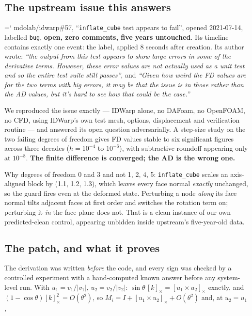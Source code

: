 \documentclass[11pt,a4paper]{article}
\newcommand{\artifact}[1]{{\small\ttfamily\hyphenchar\font=`\-\relax
  \def\_{\textunderscore\allowbreak}#1}}
\begin{document}
\subsection{The upstream issue this answers}

\artifact{mdolab/idwarp\#57}, ``\texttt{inflate\_cube} test appears to fail'', opened
2021-07-14, labelled \texttt{bug}, \textbf{open, zero comments, five years untouched}. Its
timeline contains exactly one event: the label, applied 8 seconds after creation. Its author
wrote: \emph{``the output from this test appears to show large errors in some of the
derivative terms. However, these error values are not actually used as a unit test and so the
entire test suite still passes''}, and \emph{``Given how weird the FD values are for the two
terms with big errors, it may be that the issue is in those rather than the AD values, but
it's hard to see how that could be the case.''}

We reproduced the issue exactly --- IDWarp alone, no DAFoam, no OpenFOAM, no CFD, using
IDWarp's own test mesh, options, displacement and verification routine --- and answered its
open question adversarially. A step-size study on the two failing degrees of freedom gives FD
values stable to six significant figures across three decades (\(h = 10^{-4}\) to
\(10^{-6}\)), with subtractive roundoff appearing only at \(10^{-8}\).
\textbf{The finite difference is converged; the AD is the wrong one.}

Why degrees of freedom 0 and 3 and not 1, 2, 4, 5: \texttt{inflate\_cube} scales an
axis-aligned block by (1.1, 1.2, 1.3), which leaves every face normal \emph{exactly}
unchanged, so the guard fires even at the deformed state. Perturbing a node \emph{along} its
face normal tilts adjacent faces at first order and switches the rotation term on; perturbing
it \emph{in} the face plane does not. That is a clean instance of our own predicted-clean
control, appearing unbidden inside upstream's five-year-old data.

\subsection{The patch, and what it proves}

The derivation was written \emph{before} the code, and every sign was checked by a controlled
experiment with a hand-computed known answer before any system-level run. With
\(u_1 = v_1/\lvert v_1\rvert\), \(u_2 = v_2/\lvert v_2\rvert\): \(\sin\theta\,[k]_\times =
[u_1\times u_2]_\times\) exactly, and \((1-\cos\theta)[k]_\times^2 = O(\theta^2)\), so
\(M_i = I + [u_1\times u_2]_\times + O(\theta^2)\) and, at \(u_2 = u_1\),
\end{document}
